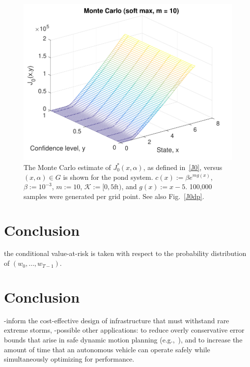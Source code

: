 \documentclass[letterpaper, 10 pt, conference]{ieeeconf}  %
\begin{document}
\begin{figure}[thpb]
      \centering
      \includegraphics[scale=0.5]{monte_carlo_sum_sept112018.pdf}
      \caption{The Monte Carlo estimate of $J_0^*(x,\alpha)$, as defined in~\eqref{J0}, versus $(x, \alpha) \in G$ is shown for the pond system.
	  $c(x) := \beta e^{m g(x)}$, $\beta := 10^{-3}$, $m := 10$, $\mathcal{K} := [0, 5\text{ft})$, and $g(x) := x-5$.
	  100,000 samples were generated per grid point. See also Fig.~\ref{J0dp}.}
      \label{J0mc}
\end{figure}









\section{Conclusion}\label{conc}



the conditional value-at-risk is taken with respect to the probability distribution of $(w_0, \dots, w_{T-1})$. 

\section{Conclusion}\label{conclusion}
-inform the cost-effective design of infrastructure that must withstand rare extreme storms,
-possible other applications: to reduce overly conservative error bounds that arise in safe dynamic motion planning (e.g.,~\cite{herbert2017fastrack}), 
and to increase the amount of time that an autonomous vehicle can operate safely while simultaneously optimizing for performance.
\end{document}
